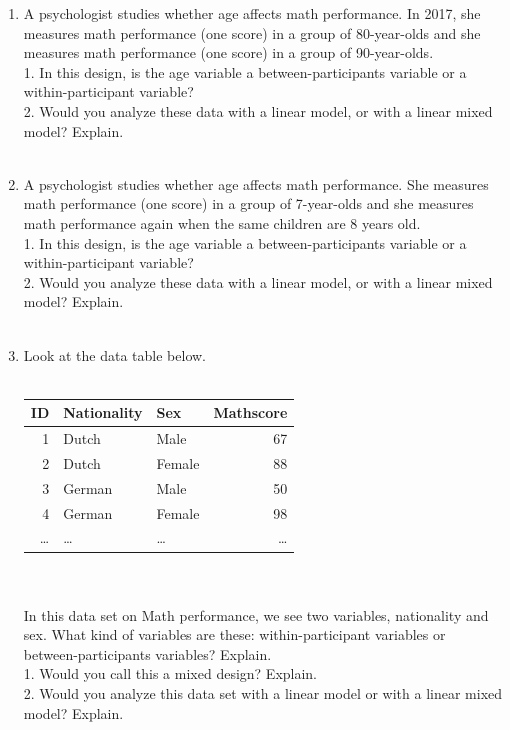 \documentclass[]{book}\usepackage[]{graphicx}\usepackage[]{color}
\begin{document}
\begin{enumerate}
\item A psychologist studies whether age affects math performance. In 2017, she measures math performance (one score) in a group of 80-year-olds and she measures math performance (one score) in a group of 90-year-olds. \\
1. In this design, is the age variable a between-participants variable or a within-participant variable?  \\
2. Would you analyze these data with a linear model, or with a linear mixed model? Explain. 
\\
\\
\item A psychologist studies whether age affects math performance. She measures math performance (one score) in a group of 7-year-olds and she measures math performance again when the same children are 8 years old. \\
1. In this design, is the age variable a between-participants variable or a within-participant variable?  \\
2. Would you analyze these data with a linear model, or with a linear mixed model? Explain. 
\\
\\
\item Look at the data table below.
\\
 \\
 \begin{tabular}{rllr}
  ID & Nationality & Sex & Mathscore  \\ \hline
  1   & Dutch      &  Male & 67   \\
 2   &  Dutch     &  Female & 88   \\
 3    & German         &  Male & 50   \\
 4   &  German        &  Female & 98  \\
  \dots   & \dots        &  \dots& \dots  \\
 \end{tabular}
\\
\\
In this data set on Math performance, we see two variables, nationality and sex. What kind of variables are these: within-participant variables or between-participants variables? Explain.
\\
1. Would you call this a mixed design? Explain.\\
2. Would you analyze this data set with a linear model or with a linear mixed model? Explain.
\\

\end{enumerate}
\end{document}
